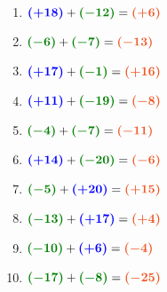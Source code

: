 \documentclass[a4paper,12pt]{report}
\begin{document}
\begin{Correction}
\begin{EXO}{}{}
\begin{multicols}{3}
\begin{enumerate}[]
\item \begin{minipage}[t]{\linewidth}$ {\color{blue}\boldsymbol{(+18)}} + {\color[HTML]{008002}\boldsymbol{(-12)}} = {\color[HTML]{F15929}\boldsymbol{(+6)}} $\end{minipage}
\item \begin{minipage}[t]{\linewidth}$ {\color[HTML]{008002}\boldsymbol{(-6)}} + {\color[HTML]{008002}\boldsymbol{(-7)}} = {\color[HTML]{F15929}\boldsymbol{(-13)}} $\end{minipage}
\item \begin{minipage}[t]{\linewidth}$ {\color{blue}\boldsymbol{(+17)}} + {\color[HTML]{008002}\boldsymbol{(-1)}} = {\color[HTML]{F15929}\boldsymbol{(+16)}} $\end{minipage}
\item \begin{minipage}[t]{\linewidth}$ {\color{blue}\boldsymbol{(+11)}} + {\color[HTML]{008002}\boldsymbol{(-19)}} = {\color[HTML]{F15929}\boldsymbol{(-8)}} $\end{minipage}
\item \begin{minipage}[t]{\linewidth}$ {\color[HTML]{008002}\boldsymbol{(-4)}} + {\color[HTML]{008002}\boldsymbol{(-7)}} = {\color[HTML]{F15929}\boldsymbol{(-11)}} $\end{minipage}
\item \begin{minipage}[t]{\linewidth}$ {\color{blue}\boldsymbol{(+14)}} + {\color[HTML]{008002}\boldsymbol{(-20)}} = {\color[HTML]{F15929}\boldsymbol{(-6)}} $\end{minipage}
\item \begin{minipage}[t]{\linewidth}$ {\color[HTML]{008002}\boldsymbol{(-5)}} + {\color{blue}\boldsymbol{(+20)}} = {\color[HTML]{F15929}\boldsymbol{(+15)}} $\end{minipage}
\item \begin{minipage}[t]{\linewidth}$ {\color[HTML]{008002}\boldsymbol{(-13)}} + {\color{blue}\boldsymbol{(+17)}} = {\color[HTML]{F15929}\boldsymbol{(+4)}} $\end{minipage}
\item \begin{minipage}[t]{\linewidth}$ {\color[HTML]{008002}\boldsymbol{(-10)}} + {\color{blue}\boldsymbol{(+6)}} = {\color[HTML]{F15929}\boldsymbol{(-4)}} $\end{minipage}
\item \begin{minipage}[t]{\linewidth}$ {\color[HTML]{008002}\boldsymbol{(-17)}} + {\color[HTML]{008002}\boldsymbol{(-8)}} = {\color[HTML]{F15929}\boldsymbol{(-25)}} $\end{minipage}
\end{enumerate}
\end{multicols}


\end{EXO}
\end{Correction}
\end{document}
